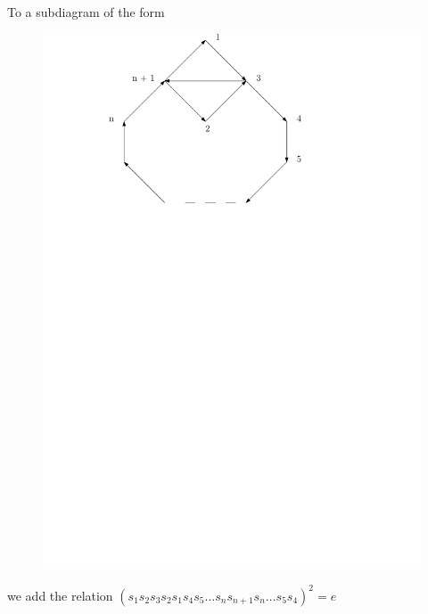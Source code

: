 \documentclass{beamer}
\begin{document}
\begin{frame}
To a subdiagram of the form 
\begin{figure}
\includegraphics[scale = .50]{Diagram2.pdf}
\end{figure}
we add the relation $(s_{1}s_{2}s_{3}s_{2}s_{1}s_{4}s_{5} \dots s_{n}s_{n+1}s_{n} \dots s_{5}s_{4})^{2} = e$
\end{frame}
\end{document}
